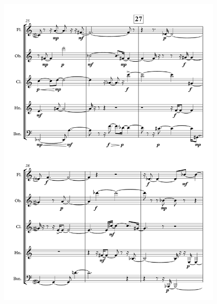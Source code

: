 \begin{figure}[H]
    \centering
	\includegraphics[width=6.5in]{figures/Out_of_Focus_5.pdf}
\end{figure}

